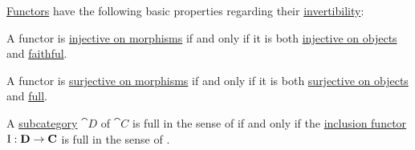 \begin{proposition}\label{thm:def:functor_invertibility/properties}
  \hyperref[def:functor]{Functors} have the following basic properties regarding their \hyperref[def:functor_invertibility]{invertibility}:

  \begin{thmenum}
     A functor is \hyperref[def:functor_invertibility/injective_on_morphisms]{injective on morphisms} if and only if it is both \hyperref[def:functor_invertibility/injective_on_objects]{injective on objects} and \hyperref[def:functor_invertibility/faithful]{faithful}.

     A functor is \hyperref[def:functor_invertibility/surjective_on_morphisms]{surjective on morphisms} if and only if it is both \hyperref[def:functor_invertibility/surjective_on_objects]{surjective on objects} and \hyperref[def:functor_invertibility/full]{full}.

     A \hyperref[def:subcategory]{subcategory} \( \cat{D} \) of \( \cat{C} \) is full in the sense of  if and only if the \hyperref[ex:inclusion_functor]{inclusion functor} \( \operatorname{I}: \operatorname{\mathbf{D}} \to \operatorname{\mathbf{C}} \) is full in the sense of .
  \end{thmenum}
\end{proposition}
